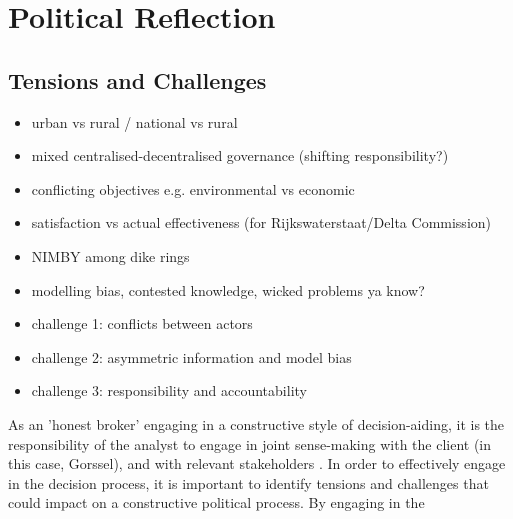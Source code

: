 \section{Political Reflection}
\label{s:poli_reflect}

\subsection{Tensions and Challenges}
\begin{itemize}
    \item urban vs rural / national vs rural
    \item mixed centralised-decentralised governance (shifting responsibility?)
    \item conflicting objectives e.g. environmental vs economic
    \item satisfaction vs actual effectiveness (for Rijkswaterstaat/Delta Commission)
    \item NIMBY among dike rings
    \item modelling bias, contested knowledge, wicked problems ya know?
    
    \item challenge 1: conflicts between actors
    \item challenge 2: asymmetric information and model bias
    \item challenge 3: responsibility and accountability
\end{itemize}


As an 'honest broker' engaging in a constructive style of decision-aiding, it is the responsibility of the analyst to engage in joint sense-making with the client (in this case, Gorssel), and with relevant stakeholders \parencite{tsoukias_decision_2008}. In order to effectively engage in the decision process, it is important to identify tensions and challenges that could impact on a constructive political process. 
By engaging in the 


